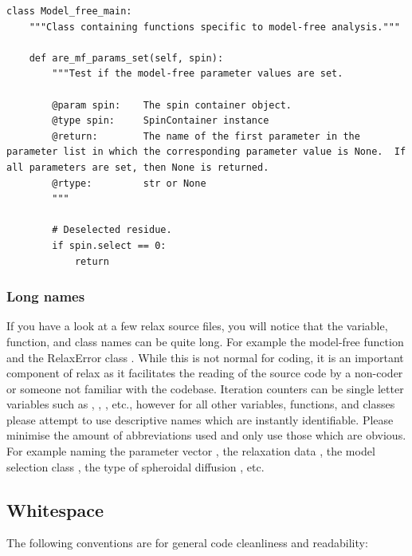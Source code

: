 \begin{lstlisting}
class Model_free_main:
    """Class containing functions specific to model-free analysis."""

    def are_mf_params_set(self, spin):
        """Test if the model-free parameter values are set.

        @param spin:    The spin container object.
        @type spin:     SpinContainer instance
        @return:        The name of the first parameter in the parameter list in which the corresponding parameter value is None.  If all parameters are set, then None is returned.
        @rtype:         str or None
        """

        # Deselected residue.
        if spin.select == 0:
            return
\end{lstlisting}



\subsubsection{Long names}

If you have a look at a few relax source files, you will notice that the variable, function, and class names can be quite long.  For example the model-free function  and the RelaxError class .  While this is not normal for coding, it is an important component of relax as it facilitates the reading of the source code by a non-coder or someone not familiar with the codebase.  Iteration counters can be single letter variables such as , , , etc., however for all other variables, functions, and classes please attempt to use descriptive names which are instantly identifiable.  Please minimise the amount of abbreviations used and only use those which are obvious.  For example naming the parameter vector , the relaxation data , the model selection class , the type of spheroidal diffusion , etc.



\subsection{Whitespace}

The following conventions are for general code cleanliness and readability:

